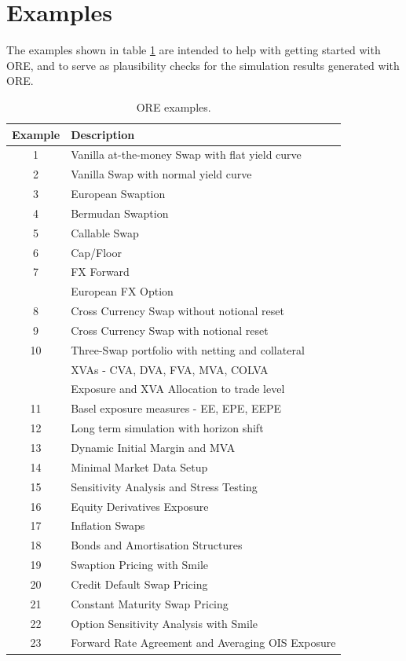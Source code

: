 \documentclass[12pt, a4paper]{article}
\begin{document}
\section{Examples}\label{sec:examples}

The examples shown in table \ref{tab_0} are intended to help with getting started with ORE, and to serve as plausibility
checks for the simulation results generated with ORE.

\begin{table}[hbt]
\scriptsize
\begin{center}
\begin{tabular}{|c|l|}
\hline
Example & Description \\
\hline
\hline
1 & Vanilla at-the-money Swap with flat yield curve \\
\hline
2 & Vanilla Swap with normal yield curve \\
\hline
3 & European Swaption \\
\hline
4 & Bermudan Swaption \\
\hline
5 & Callable Swap \\
\hline
6 & Cap/Floor \\
\hline
7 & FX Forward \\
  & European FX Option \\ 
\hline
8 & Cross Currency Swap without notional reset \\
\hline
9 & Cross Currency Swap with notional reset \\
\hline
10 & Three-Swap portfolio with netting and collateral \\
   & XVAs - CVA, DVA, FVA, MVA, COLVA \\
   & Exposure and XVA Allocation to trade level \\
\hline
11 & Basel exposure measures - EE, EPE, EEPE \\
\hline
12 & Long term simulation with horizon shift \\
\hline
13 & Dynamic Initial Margin and MVA \\
\hline
14 & Minimal Market Data Setup \\
\hline
15 & Sensitivity Analysis and Stress Testing \\
\hline
16 & Equity Derivatives Exposure \\
\hline
17 & Inflation Swaps \\
\hline
18 & Bonds and Amortisation Structures\\
\hline
19 & Swaption Pricing with Smile\\
\hline
20 & Credit Default Swap Pricing\\
\hline
21 & Constant Maturity Swap Pricing\\
\hline
22 & Option Sensitivity Analysis with Smile\\
\hline
23 & Forward Rate Agreement and Averaging OIS Exposure\\
\hline
\end{tabular}
\caption{ORE examples.}
\label{tab_0}
\end{center}
\end{table}
\end{document}
